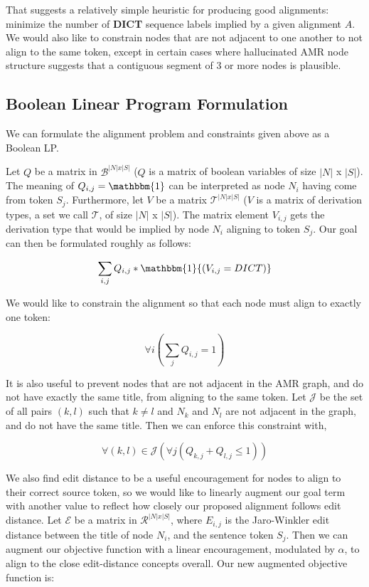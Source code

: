 \documentclass[11pt]{article}
\begin{document}
That suggests a relatively simple heuristic for producing good alignments: minimize the number of \textbf{DICT} sequence labels implied by a given alignment $A$. We would also like to constrain nodes that are not adjacent to one another to not align to the same token, except in certain cases where hallucinated AMR node structure suggests that a contiguous segment of 3 or more nodes is plausible.

\subsection{Boolean Linear Program Formulation}

We can formulate the alignment problem and constraints given above as a Boolean LP.

Let $Q$ be a matrix in $\mathcal{B}^{|N| x |S|}$ ($Q$ is a matrix of boolean variables of size $|N|$ x $|S|$). The meaning of $Q_{i,j} = \mathbbm{1}$ can be interpreted as node $N_i$ having come from token $S_j$. Furthermore, let $V$ be a matrix $\mathcal{T}^{|N| x |S|}$ ($V$ is a matrix of derivation types, a set we call $\mathcal{T}$, of size $|N|$ x $|S|$). The matrix element $V_{i,j}$ gets the derivation type that would be implied by node $N_i$ aligning to token $S_j$.  Our goal can then be formulated roughly as follows:

\[\sum_{i,j} Q_{i,j}*\mathbbm{1}{(V_{i,j} = DICT)}\]

We would like to constrain the alignment so that each node must align to exactly one token:

\[\forall i (\sum_{j} Q_{i,j} = 1)\]

It is also useful to prevent nodes that are not adjacent in the AMR graph, and do not have exactly the same title, from aligning to the same token. Let $\mathcal{J}$ be the set of all pairs $(k,l)$ such that $k \neq l$ and $N_k$ and $N_l$ are not adjacent in the graph, and do not have the same title. Then we can enforce this constraint with,

\[\forall (k,l) \in \mathcal{J} (\forall j (Q_{k,j} + Q_{l,j} \leq 1))\]

We also find edit distance to be a useful encouragement for nodes to align to their correct source token, so we would like to linearly augment our goal term with another value to reflect how closely our proposed alignment follows edit distance. Let $\mathcal{E}$ be a matrix in $\mathcal{R}^{|N|x|S|}$, where $E_{i,j}$ is the Jaro-Winkler edit distance between the title of node $N_i$, and the sentence token $S_j$. Then we can augment our objective function with a linear encouragement, modulated by $\alpha$, to align to the close edit-distance concepts overall. Our new augmented objective function is:
\end{document}
